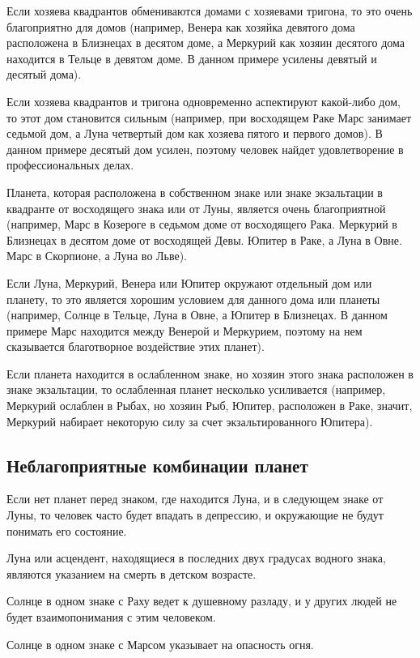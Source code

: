 Если хозяева квадрантов обмениваются домами с хозяевами тригона, то это очень благоприятно для домов (например, Венера как хозяйка девятого дома расположена в Близнецах в десятом доме, а Меркурий как хозяин десятого дома находится в Тельце в девятом доме. В данном примере усилены девятый и десятый дома).

Если хозяева квадрантов и тригона одновременно аспектируют какой-либо дом, то этот дом становится сильным (например, при восходящем Раке Марс занимает седьмой дом, а Луна четвертый дом как хозяева пятого и первого домов). В данном примере десятый дом усилен, поэтому человек найдет удовлетворение в профессиональных делах.

Планета, которая расположена в собственном знаке или знаке экзальтации в квадранте от восходящего знака или от Луны, является очень благоприятной (например, Марс в Козероге в седьмом доме от восходящего Рака. Меркурий в Близнецах в десятом доме от восходящей Девы. Юпитер в Раке, а Луна в Овне. Марс в Скорпионе, а Луна во Льве).

Если Луна, Меркурий, Венера или Юпитер окружают отдельный дом или планету, то это является хорошим условием для данного дома или планеты (например, Солнце в Тельце, Луна в Овне, а Юпитер в Близнецах. В данном примере Марс находится между Венерой и Меркурием, поэтому на нем сказывается благотворное воздействие этих планет).

Если планета находится в ослабленном знаке, но хозяин этого знака расположен в знаке экзальтации, то ослабленная планет несколько усиливается (например, Меркурий ослаблен в Рыбах, но хозяин Рыб, Юпитер, расположен в Раке, значит, Меркурий набирает некоторую силу за счет экзальтированного Юпитера).


\subsection*{Неблагоприятные комбинации планет}

Если нет планет перед знаком, где находится Луна, и в следующем знаке от Луны, то человек часто будет впадать в депрессию, и окружающие не будут понимать его состояние.

Луна или асцендент, находящиеся в последних двух градусах водного знака, являются указанием на смерть в детском возрасте.

Солнце в одном знаке с Раху ведет к душевному разладу, и у других людей не будет взаимопонимания с этим человеком.

Солнце в одном знаке с Марсом указывает на опасность огня.


